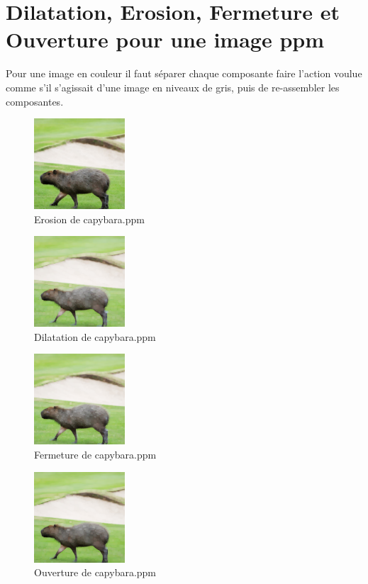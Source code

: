 \documentclass{article}
\begin{document}
\newpage
\section{Dilatation, Erosion, Fermeture et Ouverture pour une image ppm}

Pour une image en couleur il faut séparer chaque composante faire l'action voulue comme s'il s'agissait d'une image en niveaux de gris, puis de re-assembler les composantes.

\begin{figure}[h]
\centerline{\includegraphics[scale=1.4]{./rendus/ErosionColor.png}}
\caption{Erosion de capybara.ppm}
\end{figure}

\begin{figure}[h]
\centerline{\includegraphics[scale=1.4]{./rendus/DilatationColor.png}}
\caption{Dilatation de capybara.ppm}
\end{figure}

\begin{figure}[h]
\centerline{\includegraphics[scale=1.4]{./rendus/FermetureColor.png}}
\caption{Fermeture de capybara.ppm}
\end{figure}

\begin{figure}[h]
\centerline{\includegraphics[scale=1.4]{./rendus/OuvertureColor.png}}
\caption{Ouverture de capybara.ppm}
\end{figure}
\end{document}
